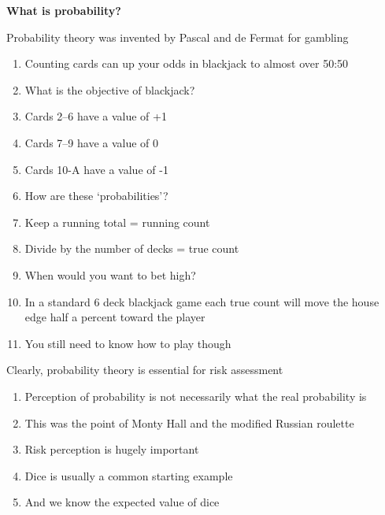 \documentclass[aspectratio=1610,pdftex,dvipsnames,compress,xcolor={dvipsnames}]{beamer}
\begin{document}
\begin{frame}[plain]{}
    \centering\LARGE\textbf{What is probability?}
\end{frame}


\addtocounter{framenumber}{-1}
\begin{frame}{Probability theory was invented by Pascal and de Fermat for gambling}
    \begin{enumerate}[series=outerlist,topsep=0pt,itemsep=5pt,leftmargin=*,label=(\arabic*)]
        \item[]Counting cards can up your odds in blackjack to almost over 50:50
        \item[]What is the objective of blackjack?
        \item[]Cards 2--6 have a value of +1
        \item[]Cards 7--9 have a value of 0
        \item[]Cards 10-A have a value of -1
        \item[]How are these `probabilities'?
        \item[]Keep a running total = running count
        \item[]Divide by the number of decks = true count
        \item[]When would you want to bet high?
        \item[]In a standard 6 deck blackjack game each true count will move the house edge half a percent toward the player
        \item[]You still need to know how to play though
    \end{enumerate}
\end{frame}


\begin{frame}{Clearly, probability theory is essential for risk assessment}
    \begin{enumerate}[series=outerlist,topsep=0pt,itemsep=21pt,leftmargin=*,label=(\arabic*)]
        \item[]Perception of probability is not necessarily what the real probability is  
        \item[]This was the point of Monty Hall and the modified Russian roulette
        \item[]Risk perception is hugely important
        \item[]Dice is usually a common starting example
        \item[]And we know the expected value of dice
    \end{enumerate}
\end{frame}
\end{document}
